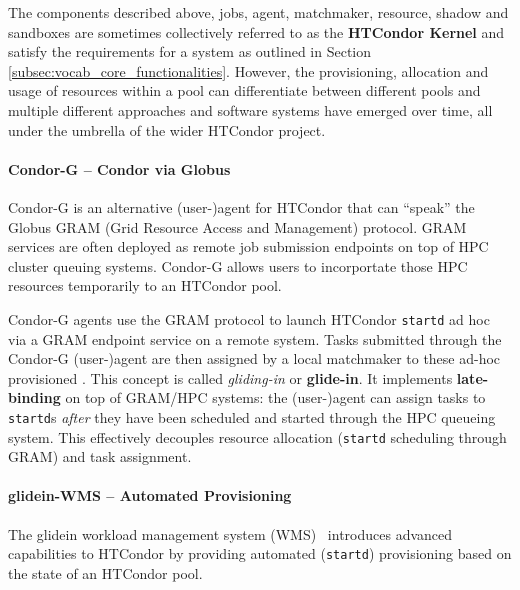 \documentclass{sig-alternate}
\begin{document}
The components described above, jobs, agent, matchmaker, resource, shadow and
sandboxes are sometimes collectively referred to as the \textbf{HTCondor
Kernel} and satisfy the requirements for a \pilotjob system as outlined in
Section \ref{subsec:vocab_core_functionalities}. However, the provisioning,
allocation and usage of resources within a pool can differentiate between
different pools and multiple different approaches and software systems have
emerged over time, all under the umbrella of the wider HTCondor project.

%
\paragraph{Condor-G -- Condor via Globus}

Condor-G is an alternative (user-)agent for HTCondor that can ``speak'' the
Globus GRAM (Grid Resource Access and Management) protocol. GRAM services are
often deployed as remote job submission endpoints on top of HPC cluster
queuing systems. Condor-G allows users to incorportate those HPC resources
temporarily to an HTCondor pool.

Condor-G agents use the GRAM protocol to launch HTCondor \texttt{startd}
\pilots ad hoc via a GRAM endpoint service on a remote system. Tasks submitted
through the Condor-G (user-)agent are then assigned by a local matchmaker to
these ad-hoc provisioned \pilots. This concept is called \textit {gliding-in}
or \textbf{glide-in}. It implements \textbf{late-binding} on top of GRAM/HPC
systems: the (user-)agent can assign tasks to \texttt{startd}s \textit{after}
they have been scheduled and started through the HPC queueing system. This
effectively decouples resource allocation (\texttt{startd} scheduling through
GRAM) and task assignment.

%
\paragraph{glidein-WMS -- Automated \pilot Provisioning}

The glidein workload management system (WMS)~\cite{1742-6596-119-6-062044} introduces advanced \pilotjob capabilities to HTCondor by 
providing automated \pilot (\texttt{startd}) provisioning based on
the state of an HTCondor pool.


%
\end{document}
